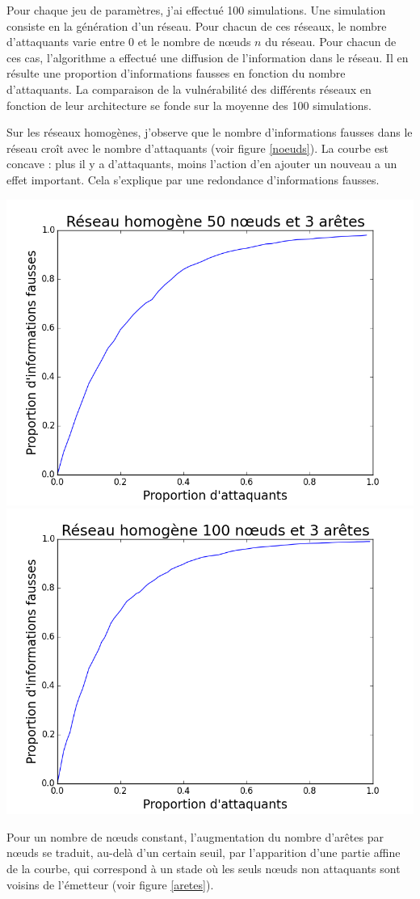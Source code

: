 \documentclass[12pt,a4paper]{article}
\begin{document}
Pour chaque jeu de paramètres, j'ai effectué 100 simulations.
Une simulation consiste en la génération d'un réseau.
Pour chacun de ces réseaux, le nombre d'attaquants varie entre 0 et le nombre de nœuds $n$ du réseau.
Pour chacun de ces cas, l'algorithme a effectué une diffusion de l'information dans le réseau.
Il en résulte une proportion d'informations fausses en fonction du nombre d'attaquants.
La comparaison de la vulnérabilité des différents réseaux en fonction de leur architecture se fonde sur la moyenne des 100 simulations. 


Sur les réseaux homogènes, j'observe que le nombre d'informations fausses dans le réseau croît avec le nombre d'attaquants (voir figure \ref{noeuds}).
La courbe est concave : plus il y a d’attaquants, moins l’action d’en ajouter un nouveau a un effet important.
Cela s'explique par une redondance d'informations fausses.

\begin{center}
\includegraphics[width=0.49\linewidth]{../resultats/atkaleat/atkaleat-50-3-2-i100.png}
\includegraphics[width=0.49\linewidth]{../resultats/atkaleat/atkaleat-100-3-1-i100.png}
 \label{noeuds}
\end{center}

Pour un nombre de nœuds constant, l'augmentation du nombre d'arêtes par nœuds se traduit, au-delà d'un certain seuil, par l'apparition d'une partie affine de la courbe, qui correspond à un stade où les seuls nœuds non attaquants sont voisins de l'émetteur (voir figure \ref{aretes}).
\end{document}
